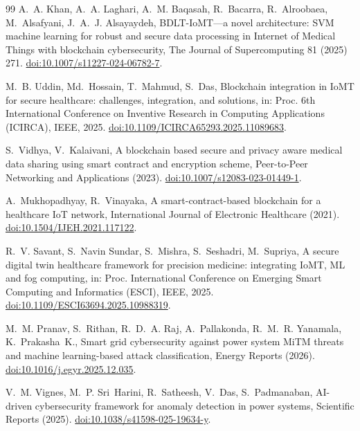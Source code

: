 \documentclass[preprint,12pt]{elsarticle}
\begin{document}
\begin{thebibliography}{99}
 A.~A. Khan, A.~A. Laghari, A.~M. Baqasah, R.~Bacarra, R.~Alroobaea, M.~Alsafyani, J.~A.~J. Alsayaydeh, BDLT-IoMT---a novel architecture: SVM machine learning for robust and secure data processing in Internet of Medical Things with blockchain cybersecurity, The Journal of Supercomputing 81 (2025) 271. \href{https://doi.org/10.1007/s11227-024-06782-7}{doi:10.1007/s11227-024-06782-7}.

 M.~B. Uddin, Md.~Hossain, T.~Mahmud, S.~Das, Blockchain integration in IoMT for secure healthcare: challenges, integration, and solutions, in: Proc. 6th International Conference on Inventive Research in Computing Applications (ICIRCA), IEEE, 2025. \href{https://doi.org/10.1109/ICIRCA65293.2025.11089683}{doi:10.1109/ICIRCA65293.2025.11089683}.

 S.~Vidhya, V.~Kalaivani, A blockchain based secure and privacy aware medical data sharing using smart contract and encryption scheme, Peer-to-Peer Networking and Applications (2023). \href{https://doi.org/10.1007/s12083-023-01449-1}{doi:10.1007/s12083-023-01449-1}. %

 A.~Mukhopadhyay, R.~Vinayaka, A smart-contract-based blockchain for a healthcare IoT network, International Journal of Electronic Healthcare (2021). \href{https://doi.org/10.1504/IJEH.2021.117122}{doi:10.1504/IJEH.2021.117122}. %

 R.~V. Savant, S.~Navin Sundar, S.~Mishra, S.~Seshadri, M.~Supriya, A secure digital twin healthcare framework for precision medicine: integrating IoMT, ML and fog computing, in: Proc. International Conference on Emerging Smart Computing and Informatics (ESCI), IEEE, 2025. \href{https://doi.org/10.1109/ESCI63694.2025.10988319}{doi:10.1109/ESCI63694.2025.10988319}.

 M.~M. Pranav, S.~Rithan, R.~D.~A. Raj, A.~Pallakonda, R.~M.~R. Yanamala, K.~Prakasha~K., Smart grid cybersecurity against power system MiTM threats and machine learning-based attack classification, Energy Reports (2026). \href{https://doi.org/10.1016/j.egyr.2025.12.035}{doi:10.1016/j.egyr.2025.12.035}. %

 V.~M. Vignes, M.~P. Sri~Harini, R.~Satheesh, V.~Das, S.~Padmanaban, AI-driven cybersecurity framework for anomaly detection in power systems, Scientific Reports (2025). \href{https://doi.org/10.1038/s41598-025-19634-y}{doi:10.1038/s41598-025-19634-y}. %


\end{thebibliography}
\end{document}
